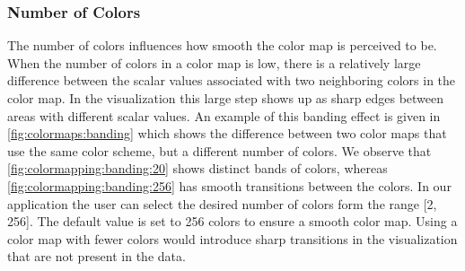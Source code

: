 \subsubsection{Number of Colors} %
\label{ssub:number_of_colors}
The number of colors influences how smooth the color map is perceived to be. When the number of colors in a color map is low, there is a relatively large difference between the scalar values associated with two neighboring colors in the color map. In the visualization this large step shows up as sharp edges between areas with different scalar values. An example of this banding effect is given in \cref{fig:colormaps:banding} which shows the difference between two color maps that use the same color scheme, but a different number of colors. We observe that \cref{fig:colormapping:banding:20} shows distinct bands of colors, whereas \cref{fig:colormapping:banding:256} has smooth transitions between the colors. In our application the user can select the desired number of colors form the range [2, 256]. The default value is set to 256 colors to ensure a smooth color map. Using a color map with fewer colors would introduce sharp transitions in the visualization that are not present in the data. 
%
